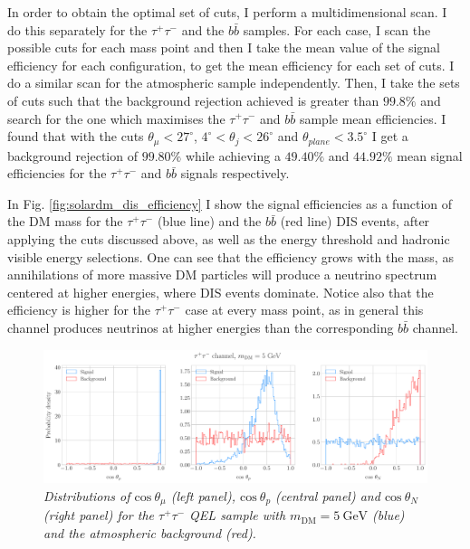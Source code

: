 In order to obtain the optimal set of cuts, I perform a multidimensional scan. I do this separately for the $\tau^{+} \tau^{-}$ and the $b\bar{b}$ samples. For each case, I scan the possible cuts for each mass point and then I take the mean value of the signal efficiency for each configuration, to get the mean efficiency for each set of cuts. I do a similar scan for the atmospheric sample independently. Then, I take the sets of cuts such that the background rejection achieved is greater than $99.8\%$ and search for the one which maximises the $\tau^{+} \tau^{-}$ and $b\bar{b}$ sample mean efficiencies. I found that with the cuts $\theta_{\mu} < 27^{\circ}$, $4^{\circ} < \theta_{j} < 26^{\circ}$ and $\theta_{plane} < 3.5^{\circ}$ I get a background rejection of $99.80\%$ while achieving a $49.40\%$ and $44.92\%$ mean signal efficiencies for the $\tau^{+} \tau^{-}$ and $b\bar{b}$ signals respectively.

In Fig. \ref{fig:solardm_dis_efficiency} I show the signal efficiencies as a function of the DM mass for the $\tau^{+} \tau^{-}$ (blue line) and the $b\bar{b}$ (red line) DIS events, after applying the cuts discussed above, as well as the energy threshold and hadronic visible energy selections. One can see that the efficiency grows with the mass, as annihilations of more massive DM particles will produce a neutrino spectrum centered at higher energies, where DIS events dominate. Notice also that the efficiency is higher for the $\tau^{+} \tau^{-}$ case at every mass point, as in general this channel produces neutrinos at higher energies than the corresponding $b\bar{b}$ channel.

\begin{figure}[t]
	\centering
	\includegraphics[width=0.95\linewidth]{Images/DM_Analysis/solardm_tau_5_qel_angular_dists.pdf}
	\caption{\textit{Distributions of $\mathrm{cos} \ \theta_{\mu}$ (left panel), $\mathrm{cos} \ \theta_{p}$ (central panel) and $\mathrm{cos} \ \theta_{N}$ (right panel) for the $\tau^{+}\tau^{-}$ QEL sample with $m_{\mathrm{DM}} = 5 \ \mathrm{GeV}$ (blue) and the atmospheric background (red).}}
	\label{fig:solardm_tau_5_qel_angular_dists}
\end{figure}

